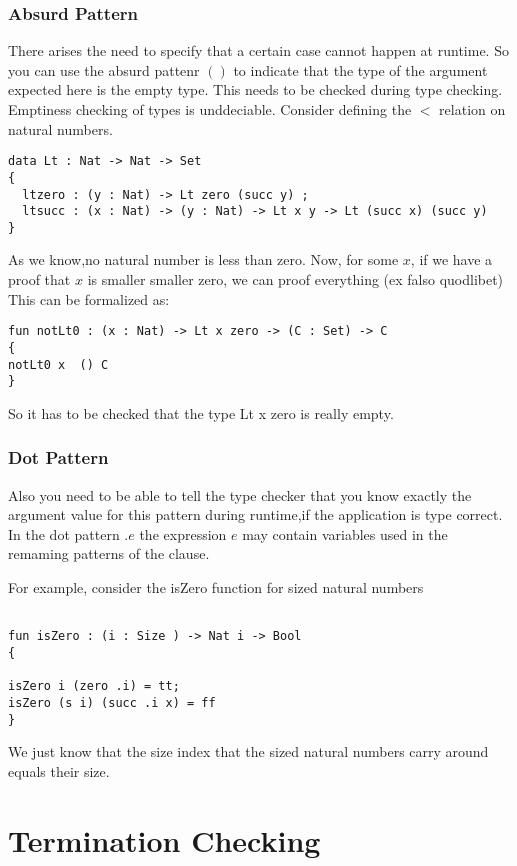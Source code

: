 \subsection{Absurd Pattern}
There arises the need to specify that a certain case cannot happen at runtime.
So you can use the absurd pattenr $ () $ to indicate that the type of the argument expected here is the empty type.
This needs to be checked during type checking. Emptiness checking of types is unddeciable.
Consider defining the $ < $ relation on natural numbers.

\begin{verbatim}
data Lt : Nat -> Nat -> Set
{
  ltzero : (y : Nat) -> Lt zero (succ y) ;
  ltsucc : (x : Nat) -> (y : Nat) -> Lt x y -> Lt (succ x) (succ y)
}

\end{verbatim}

As we know,no natural number is less than zero.
Now, for some $x$, if we have a proof that $x$ is smaller smaller zero, we can proof everything (ex falso quodlibet)
This can be formalized as:

\begin{verbatim}
fun notLt0 : (x : Nat) -> Lt x zero -> (C : Set) -> C
{
notLt0 x  () C 
}
\end{verbatim}
So it has to be checked that the type Lt x zero is really empty.

\subsection{Dot Pattern}
Also you need to be able to tell the type checker that you know exactly the argument value for this pattern during runtime,if the application is type correct.
In the dot pattern $ . e $ the expression $ e $ may contain variables used in the remaming patterns of the clause.

For example, consider the isZero function for sized natural numbers

\begin{verbatim}

fun isZero : (i : Size ) -> Nat i -> Bool
{

isZero i (zero .i) = tt;
isZero (s i) (succ .i x) = ff
}
\end{verbatim}
We just know that the size index that the sized natural numbers carry around equals their size.



\chapter{Termination Checking}

